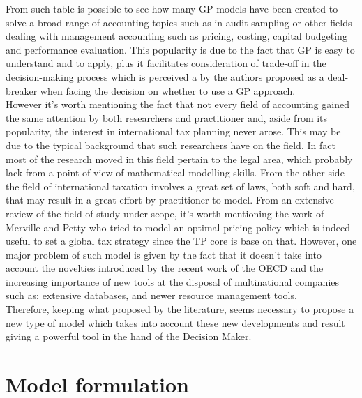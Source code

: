 \begin{doublespace}
From such table is possible to see how many GP models have been created to solve a broad range of accounting topics such as in audit sampling or other fields dealing with management accounting such as pricing, costing, capital budgeting and performance evaluation.
This popularity is due to the fact that GP is easy to understand and to apply, plus it facilitates consideration of trade-off in the decision-making process which is perceived a by the authors proposed as a deal-breaker when facing the decision on whether to use a GP approach.
\\
However it's worth mentioning the fact that not every field of accounting gained the same attention by both researchers and practitioner and, aside from its popularity, the interest in international tax planning never arose. This may be due to the typical background that such researchers have on the field. In fact most of the research moved in this field pertain to the legal area, which probably lack from a point of view of mathematical modelling skills. From the other side the field of international taxation involves a great set of laws, both soft and hard, that may result in a great effort by practitioner to model. 
From an extensive review of the field of study under scope, it’s worth mentioning the work of Merville and Petty\cite{Merville1978} who tried to model an optimal pricing policy which is indeed useful to set a global tax strategy since the TP core is base on that. However, one major problem of such model is given by the fact that it doesn't take into account the novelties introduced by the recent work of the OECD and the increasing importance of new tools at the disposal of multinational companies such as: extensive databases, and newer resource management tools.
\\
Therefore, keeping what proposed by the literature, seems necessary to propose a new type of model which takes into account these new developments and result giving a powerful tool in the hand of the Decision Maker.

\pagebreak

\section{Model formulation}


\end{doublespace}

